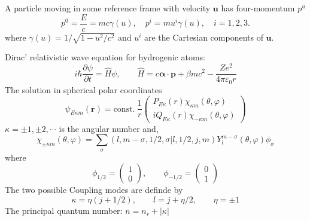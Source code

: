 \documentclass[a4paper,lang=cn,a4paper]{elegantpaper}
\newcommand{\vect}[1]{\boldsymbol{#1}}
\begin{document}
A particle moving in some reference frame with velocity $\vect{u}$ has
four-momentum $p^u$ 
\begin{equation*}
    p^0=\frac{E}{c}=mc\gamma(u), \quad p^i =mu^i \gamma(u),\quad i=1,2,3.
\end{equation*}
where $\gamma(u)=1/\sqrt{1-u^2/c^2}$ and $u^i$ are the Cartesian components 
of $\vect{u}$.

Dirac' relativistic wave equation for hydrogenic atoms:
\begin{equation*}
    i\hbar\frac{\partial \psi}{\partial t}=\hat{H}\psi,\qquad 
    \hat{H}=c\vect{\alpha}\cdot\vect{p}+\beta mc^2-\frac{Ze^2}{4 \pi \varepsilon_0 r}
\end{equation*}
The solution in spherical polar coordinates
\begin{equation*}
    \psi_{E\kappa m}(\vect{r})=\text{const.}\ \frac{1}{r}
    \begin{pmatrix}
        P_{E\kappa}(r)\chi_{\kappa m}(\theta,\varphi)\\
        iQ_{E\kappa}(r)\chi_{-\kappa m}(\theta,\varphi)
    \end{pmatrix}
\end{equation*}
$\kappa=\pm 1,\pm 2,\cdots$ is the angular number and,
\begin{equation*}
    \chi_{\pm\kappa m}(\theta, \varphi)=\sum_{\sigma}
    (l,m-\sigma ,1/2,\sigma |l,1/2,j,m)Y^{m-\sigma}_l (\theta, \varphi)\phi_{\sigma}
\end{equation*}
where
\begin{equation*}
    \phi_{1/2}=\begin{pmatrix}1 \\0\end{pmatrix},\qquad
    \phi_{-1/2}=\begin{pmatrix}0 \\1\end{pmatrix}
\end{equation*}
The two possible Coupling modes are definde by 
\begin{equation*}
    \kappa=\eta (j+1/2),\qquad l=j+\eta /2 ,\qquad \eta =\pm 1
\end{equation*}
The principal quantum number: $n=n_r+|\kappa|$
\end{document}
